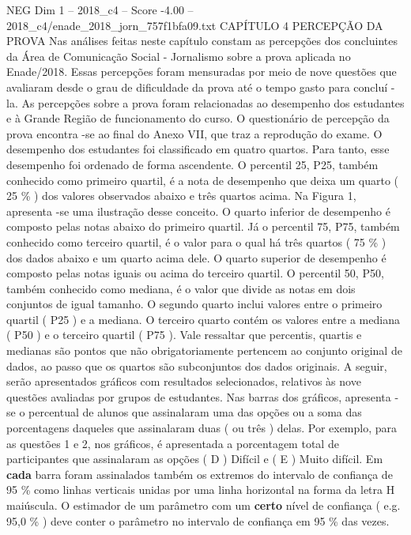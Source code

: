 \begin{textsample}{NEG Dim 1 – 2018\_c4 – Score -4.00 – 2018\_c4/enade\_2018\_jorn\_757f1bfa09.txt}  \label{ex:f1_neg_139}
CAPÍTULO 4 PERCEPÇÃO DA PROVA Nas análises feitas neste capítulo constam as percepções dos concluintes da Área de Comunicação Social - Jornalismo sobre a prova aplicada no Enade/2018.
Essas percepções foram mensuradas por meio de nove questões que avaliaram desde o grau de dificuldade da prova até o tempo gasto para concluí -la.
As percepções sobre a prova foram relacionadas ao desempenho dos estudantes e à Grande Região de funcionamento do curso.
O questionário de percepção da prova encontra -se ao final do Anexo VII, que traz a reprodução do exame.
O desempenho dos estudantes foi classificado em quatro quartos.
Para tanto, esse desempenho foi ordenado de forma ascendente.
O percentil 25, P25, também conhecido como primeiro quartil, é a nota de desempenho que deixa um quarto ( 25 \% ) dos valores observados abaixo e três quartos acima.
Na Figura 1, apresenta -se uma ilustração desse conceito.
O quarto inferior de desempenho é composto pelas notas abaixo do primeiro quartil.
Já o percentil 75, P75, também conhecido como terceiro quartil, é o valor para o qual há três quartos ( 75 \% ) dos dados abaixo e um quarto acima dele.
O quarto superior de desempenho é composto pelas notas iguais ou acima do terceiro quartil.
O percentil 50, P50, também conhecido como mediana, é o valor que divide as notas em dois conjuntos de igual tamanho.
O segundo quarto inclui valores entre o primeiro quartil ( P25 ) e a mediana.
O terceiro quarto contém os valores entre a mediana ( P50 ) e o terceiro quartil ( P75 ).
Vale ressaltar que percentis, quartis e medianas são pontos que não obrigatoriamente pertencem ao conjunto original de dados, ao passo que os quartos são subconjuntos dos dados originais.
A seguir, serão apresentados gráficos com resultados selecionados, relativos às nove questões avaliadas por grupos de estudantes.
Nas barras dos gráficos, apresenta -se o percentual de alunos que assinalaram uma das opções ou a soma das porcentagens daqueles que assinalaram duas ( ou três ) delas.
Por exemplo, para as questões 1 e 2, nos gráficos, é apresentada a porcentagem total de participantes que assinalaram as opções ( D ) Difícil e ( E ) Muito difícil.
Em \textbf{cada} barra foram assinalados também os extremos do intervalo de confiança de 95 \% como linhas verticais unidas por uma linha horizontal na forma da letra H maiúscula.
O estimador de um parâmetro com um \textbf{certo} nível de confiança ( e.g. 95,0 \% ) deve conter o parâmetro no intervalo de confiança em 95 \% das vezes.

\end{textsample}
